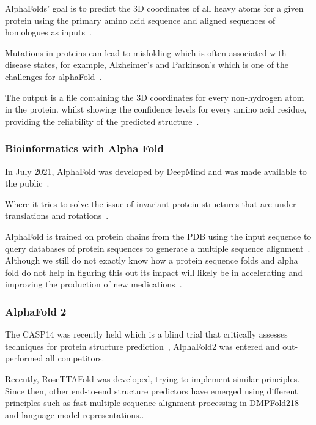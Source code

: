 \documentclass{report}
\begin{document}
AlphaFolds' goal is to predict the 3D coordinates of all heavy atoms for a given protein using the primary amino acid sequence and aligned sequences of homologues as inputs~\cite{jumper_highly_2021}.

Mutations in proteins can lead to misfolding which is often associated with disease states, for example, Alzheimer’s and Parkinson’s which is one of the challenges for alphaFold~\cite{felix_brief_nodate}.

The output is a file containing the 3D coordinates for every non-hydrogen atom in the protein. whilst showing the confidence levels for every amino acid residue, providing the reliability of the predicted structure~\cite{felix_brief_nodate}.

\subsubsection{Bioinformatics with Alpha Fold}

In July 2021, AlphaFold was developed by DeepMind and was made available to
the public~\cite{tunyasuvunakool_highly_2021}. 

Where it tries to solve the issue of invariant protein structures that are under translations and rotations~\cite{baldi_principled_nodate}.

AlphaFold is trained on protein chains from the PDB using the input sequence to query databases of protein sequences to generate a multiple sequence alignment~\cite{jumper_highly_2021}. Although we still do not exactly know how a protein sequence folds and alpha fold do not help in figuring this out its impact will likely be in accelerating and improving the production of new medications~\cite{nussinov_alphafold_2022}.


\subsubsection{AlphaFold 2}

The CASP14 was recently held which is a blind trial that critically assesses
techniques for protein structure prediction~\cite{david_alphafold_2022}, AlphaFold2 was entered and out-performed all competitors. 

Recently, RoseTTAFold was developed, trying to implement similar principles. Since then, other end-to-end structure predictors have emerged using different principles such as fast multiple sequence alignment processing in DMPFold218 and language model representations.\cite{bryant_improved_2022}.
\end{document}
